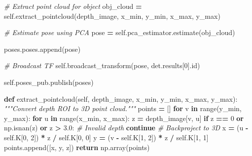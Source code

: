 \documentclass[
]{article}
\newenvironment{Shaded}{\begin{snugshade}}{\end{snugshade}}
\newcommand{\BuiltInTok}[1]{#1}
\newcommand{\CommentTok}[1]{\textcolor[rgb]{0.56,0.35,0.01}{\textit{#1}}}
\newcommand{\ControlFlowTok}[1]{\textcolor[rgb]{0.13,0.29,0.53}{\textbf{#1}}}
\newcommand{\DecValTok}[1]{\textcolor[rgb]{0.00,0.00,0.81}{#1}}
\newcommand{\FloatTok}[1]{\textcolor[rgb]{0.00,0.00,0.81}{#1}}
\newcommand{\KeywordTok}[1]{\textcolor[rgb]{0.13,0.29,0.53}{\textbf{#1}}}
\newcommand{\NormalTok}[1]{#1}
\newcommand{\OperatorTok}[1]{\textcolor[rgb]{0.81,0.36,0.00}{\textbf{#1}}}
\newcommand{\VariableTok}[1]{\textcolor[rgb]{0.00,0.00,0.00}{#1}}
\begin{document}
\begin{Shaded}
\begin{Highlighting}[]
            \CommentTok{\# Extract point cloud for object}
\NormalTok{            obj\_cloud }\OperatorTok{=} \VariableTok{self}\NormalTok{.extract\_pointcloud(depth\_image, x\_min, y\_min, x\_max, y\_max)}

            \CommentTok{\# Estimate pose using PCA}
\NormalTok{            pose }\OperatorTok{=} \VariableTok{self}\NormalTok{.pca\_estimator.estimate(obj\_cloud)}

\NormalTok{            poses.poses.append(pose)}

            \CommentTok{\# Broadcast TF}
            \VariableTok{self}\NormalTok{.broadcast\_transform(pose, det.results[}\DecValTok{0}\NormalTok{].}\BuiltInTok{id}\NormalTok{)}

        \VariableTok{self}\NormalTok{.poses\_pub.publish(poses)}

    \KeywordTok{def}\NormalTok{ extract\_pointcloud(}\VariableTok{self}\NormalTok{, depth\_image, x\_min, y\_min, x\_max, y\_max):}
        \CommentTok{"""Convert depth ROI to 3D point cloud."""}
\NormalTok{        points }\OperatorTok{=}\NormalTok{ []}
        \ControlFlowTok{for}\NormalTok{ v }\KeywordTok{in} \BuiltInTok{range}\NormalTok{(y\_min, y\_max):}
            \ControlFlowTok{for}\NormalTok{ u }\KeywordTok{in} \BuiltInTok{range}\NormalTok{(x\_min, x\_max):}
\NormalTok{                z }\OperatorTok{=}\NormalTok{ depth\_image[v, u]}
                \ControlFlowTok{if}\NormalTok{ z }\OperatorTok{==} \DecValTok{0} \KeywordTok{or}\NormalTok{ np.isnan(z) }\KeywordTok{or}\NormalTok{ z }\OperatorTok{\textgreater{}} \FloatTok{3.0}\NormalTok{:  }\CommentTok{\# Invalid depth}
                    \ControlFlowTok{continue}
                \CommentTok{\# Backproject to 3D}
\NormalTok{                x }\OperatorTok{=}\NormalTok{ (u }\OperatorTok{{-}} \VariableTok{self}\NormalTok{.K[}\DecValTok{0}\NormalTok{, }\DecValTok{2}\NormalTok{]) }\OperatorTok{*}\NormalTok{ z }\OperatorTok{/} \VariableTok{self}\NormalTok{.K[}\DecValTok{0}\NormalTok{, }\DecValTok{0}\NormalTok{]}
\NormalTok{                y }\OperatorTok{=}\NormalTok{ (v }\OperatorTok{{-}} \VariableTok{self}\NormalTok{.K[}\DecValTok{1}\NormalTok{, }\DecValTok{2}\NormalTok{]) }\OperatorTok{*}\NormalTok{ z }\OperatorTok{/} \VariableTok{self}\NormalTok{.K[}\DecValTok{1}\NormalTok{, }\DecValTok{1}\NormalTok{]}
\NormalTok{                points.append([x, y, z])}
        \ControlFlowTok{return}\NormalTok{ np.array(points)}


\end{Highlighting}
\end{Shaded}
\end{document}
